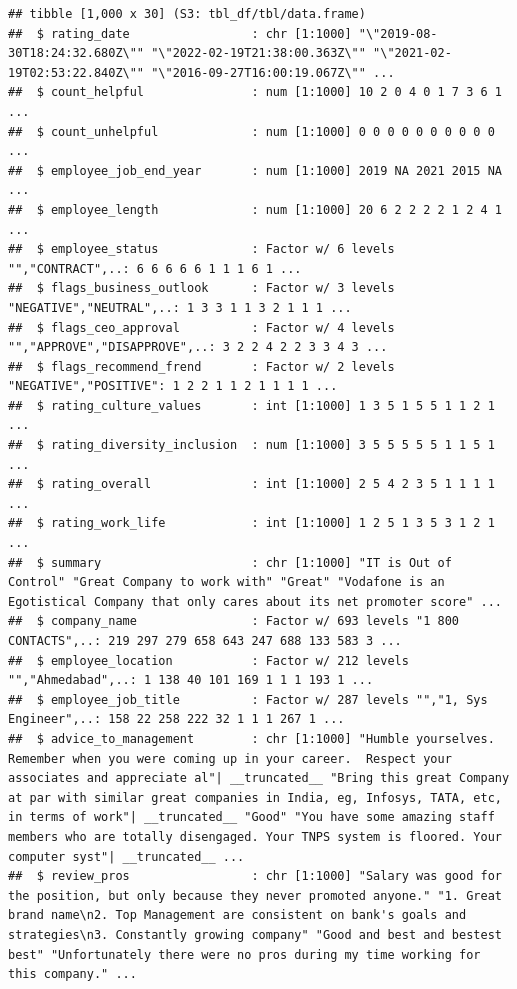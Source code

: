 \documentclass[
]{article}
\begin{document}
\begin{verbatim}
## tibble [1,000 x 30] (S3: tbl_df/tbl/data.frame)
##  $ rating_date                 : chr [1:1000] "\"2019-08-30T18:24:32.680Z\"" "\"2022-02-19T21:38:00.363Z\"" "\"2021-02-19T02:53:22.840Z\"" "\"2016-09-27T16:00:19.067Z\"" ...
##  $ count_helpful               : num [1:1000] 10 2 0 4 0 1 7 3 6 1 ...
##  $ count_unhelpful             : num [1:1000] 0 0 0 0 0 0 0 0 0 0 ...
##  $ employee_job_end_year       : num [1:1000] 2019 NA 2021 2015 NA ...
##  $ employee_length             : num [1:1000] 20 6 2 2 2 2 1 2 4 1 ...
##  $ employee_status             : Factor w/ 6 levels "","CONTRACT",..: 6 6 6 6 6 1 1 1 6 1 ...
##  $ flags_business_outlook      : Factor w/ 3 levels "NEGATIVE","NEUTRAL",..: 1 3 3 1 1 3 2 1 1 1 ...
##  $ flags_ceo_approval          : Factor w/ 4 levels "","APPROVE","DISAPPROVE",..: 3 2 2 4 2 2 3 3 4 3 ...
##  $ flags_recommend_frend       : Factor w/ 2 levels "NEGATIVE","POSITIVE": 1 2 2 1 1 2 1 1 1 1 ...
##  $ rating_culture_values       : int [1:1000] 1 3 5 1 5 5 1 1 2 1 ...
##  $ rating_diversity_inclusion  : num [1:1000] 3 5 5 5 5 5 1 1 5 1 ...
##  $ rating_overall              : int [1:1000] 2 5 4 2 3 5 1 1 1 1 ...
##  $ rating_work_life            : int [1:1000] 1 2 5 1 3 5 3 1 2 1 ...
##  $ summary                     : chr [1:1000] "IT is Out of Control" "Great Company to work with" "Great" "Vodafone is an Egotistical Company that only cares about its net promoter score" ...
##  $ company_name                : Factor w/ 693 levels "1 800 CONTACTS",..: 219 297 279 658 643 247 688 133 583 3 ...
##  $ employee_location           : Factor w/ 212 levels "","Ahmedabad",..: 1 138 40 101 169 1 1 1 193 1 ...
##  $ employee_job_title          : Factor w/ 287 levels "","1, Sys Engineer",..: 158 22 258 222 32 1 1 1 267 1 ...
##  $ advice_to_management        : chr [1:1000] "Humble yourselves.  Remember when you were coming up in your career.  Respect your associates and appreciate al"| __truncated__ "Bring this great Company at par with similar great companies in India, eg, Infosys, TATA, etc, in terms of work"| __truncated__ "Good" "You have some amazing staff members who are totally disengaged. Your TNPS system is floored. Your computer syst"| __truncated__ ...
##  $ review_pros                 : chr [1:1000] "Salary was good for the position, but only because they never promoted anyone." "1. Great brand name\n2. Top Management are consistent on bank's goals and strategies\n3. Constantly growing company" "Good and best and bestest best" "Unfortunately there were no pros during my time working for this company." ...

\end{verbatim}
\end{document}
